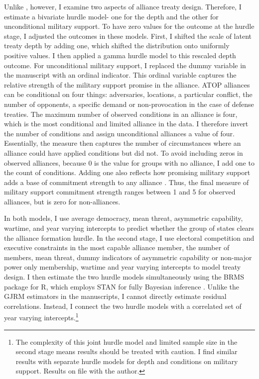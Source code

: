 \documentclass[12pt]{article}
\begin{document}
Unlike \citet{Chibaetal2015}, however, I examine two aspects of alliance treaty design. 
Therefore, I estimate a bivariate hurdle model- one for the depth and the other for unconditional military support. 
To have zero values for the outcome at the hurdle stage, I adjusted the outcomes in these models. 
First, I shifted the scale of latent treaty depth by adding one, which shifted the distribution onto uniformly positive values. 
I then applied a gamma hurdle model to this rescaled depth outcome.  
For unconditional military support, I replaced the dummy variable in the manuscript with an ordinal indicator.
This ordinal variable captures the relative strength of the military support promise in the alliance. 
ATOP alliances can be conditional on four things: adversaries, locations, a particular conflict, the number of opponents, a specific demand or non-provocation in the case of defense treaties. 
The maximum number of observed conditions in an alliance is four, which is the most conditional and limited alliance in the data. 
I therefore invert the number of conditions and assign unconditional alliances a value of four. 
Essentially, the measure then captures the number of circumstances where an alliance could have applied conditions but did not. 
To avoid including zeros in observed alliances, because 0 is the value for groups with no alliance, I add one to the count of conditions.
Adding one also reflects how promising military support adds a base of commitment strength to any alliance \citep{Morrow2000}. 
Thus, the final measure of military support commitment strength ranges between 1 and 5 for observed alliances, but is zero for non-alliances. 


In both models, I use average democracy, mean threat, asymmetric capability, wartime, and year varying intercepts to predict whether the group of states clears the alliance formation hurdle.
In the second stage, I use electoral competition and executive constraints in the most capable alliance member, the number of members, mean threat, dummy indicators of asymmetric capability or non-major power only membership, wartime and year varying intercepts to model treaty design. 
I then estimate the two hurdle models simultaneously using the BRMS package for \textsf{R}, which employs STAN for fully Bayesian inference \citep{Buerkner2017}. 
Unlike the GJRM estimators in the manuscripts, I cannot directly estimate residual correlations.
Instead, I connect the two hurdle models with a correlated set of year varying intercepts.\footnote{The complexity of this joint hurdle model and limited sample size in the second stage means results should be treated with caution. I find similar results with separate hurdle models for depth and conditions on military support. Results on file with the author.} 
\end{document}
